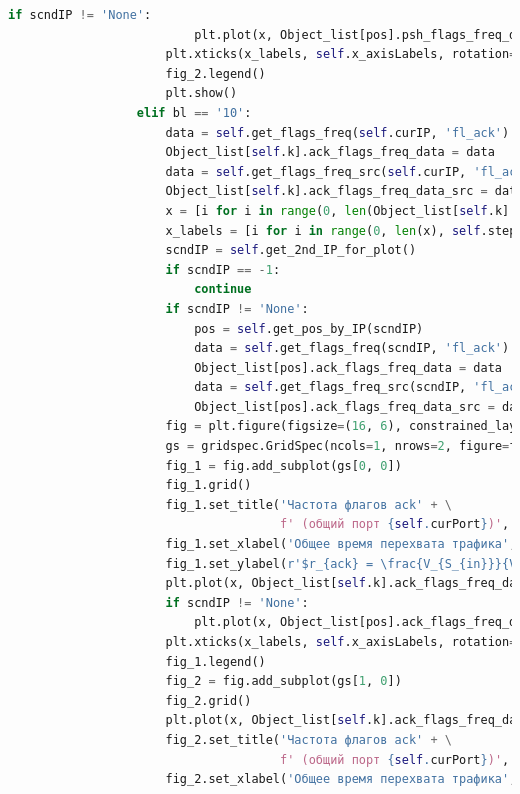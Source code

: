\documentclass[bachelor, och, coursework]{SCWorks}
\begin{document}
\begin{lstlisting}[language=Python]
                      if scndIP != 'None':
                          plt.plot(x, Object_list[pos].psh_flags_freq_data_src, 'g', label=scndIP)
                      plt.xticks(x_labels, self.x_axisLabels, rotation=30, fontsize=8)
                      fig_2.legend()
                      plt.show()
                  elif bl == '10':
                      data = self.get_flags_freq(self.curIP, 'fl_ack')
                      Object_list[self.k].ack_flags_freq_data = data
                      data = self.get_flags_freq_src(self.curIP, 'fl_ack')
                      Object_list[self.k].ack_flags_freq_data_src = data
                      x = [i for i in range(0, len(Object_list[self.k].ack_flags_freq_data))]
                      x_labels = [i for i in range(0, len(x), self.step)]
                      scndIP = self.get_2nd_IP_for_plot()
                      if scndIP == -1:
                          continue
                      if scndIP != 'None':
                          pos = self.get_pos_by_IP(scndIP)
                          data = self.get_flags_freq(scndIP, 'fl_ack')
                          Object_list[pos].ack_flags_freq_data = data
                          data = self.get_flags_freq_src(scndIP, 'fl_ack')
                          Object_list[pos].ack_flags_freq_data_src = data
                      fig = plt.figure(figsize=(16, 6), constrained_layout=True)
                      gs = gridspec.GridSpec(ncols=1, nrows=2, figure=fig)
                      fig_1 = fig.add_subplot(gs[0, 0])
                      fig_1.grid()
                      fig_1.set_title('Частота флагов ack' + \
                                      f' (общий порт {self.curPort})', fontsize=15 )
                      fig_1.set_xlabel('Общее время перехвата трафика', fontsize=15)
                      fig_1.set_ylabel(r'$r_{ack} = \frac{V_{S_{in}}}{V_{tcp}}$', fontsize=15)
                      plt.plot(x, Object_list[self.k].ack_flags_freq_data, 'b', label=self.curIP)
                      if scndIP != 'None':
                          plt.plot(x, Object_list[pos].ack_flags_freq_data, 'r', label=scndIP)
                      plt.xticks(x_labels, self.x_axisLabels, rotation=30, fontsize=8)
                      fig_1.legend()
                      fig_2 = fig.add_subplot(gs[1, 0])
                      fig_2.grid()
                      plt.plot(x, Object_list[self.k].ack_flags_freq_data_src, 'orange', label=self.curIP)
                      fig_2.set_title('Частота флагов ack' + \
                                      f' (общий порт {self.curPort})', fontsize=15 )
                      fig_2.set_xlabel('Общее время перехвата трафика', fontsize=15)

\end{lstlisting}
\end{document}
